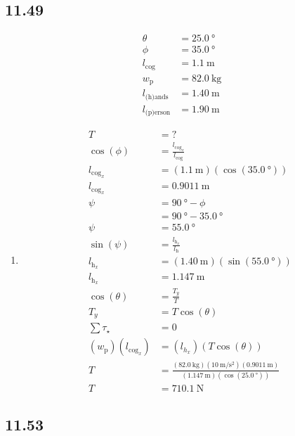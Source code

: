\documentclass{article}
\begin{document}
\subsection{11.49}
\begin{align*}
	\theta & = \SI{25.0}{\degree} \\
	\phi & = \SI{35.0}{\degree} \\
	l_\text{cog} & = \SI{1.1}{\meter} \\
	w_{\text{p}} & = \SI{82.0}{\kilogram} \\
	l_\text{(h)ands} & = \SI{1.40}{\meter} \\
	l_\text{(p)erson} & = \SI{1.90}{\meter}
\end{align*}
\begin{enumerate}[label=\textbf{(\alph*)}]
	\item
		\begin{align*}
			T & = ? \\
			\cos(\phi) & = \frac{l_{\text{cog}_x}}{l_\text{cog}} \\
			l_{\text{cog}_x} & = (\SI{1.1}{\meter})(\cos(\SI{35.0}{\degree})) \\
			l_{\text{cog}_x} & = \SI{0.9011}{\meter} \\
			\psi & = \SI{90}{\degree} - \phi \\
				 & = \SI{90}{\degree} - \SI{35.0}{\degree} \\
			\psi & = \SI{55.0}{\degree} \\
			\sin(\psi) & = \frac{l_{\text{h}_x}}{l_\text{h}} \\
			l_{\text{h}_x} & = (\SI{1.40}{\meter})(\sin(\SI{55.0}{\degree})) \\
			l_{\text{h}_x} & = \SI{1.147}{\meter} \\
			\cos(\theta) & = \frac{T_y}{T} \\
			T_y & = T\cos(\theta) \\
			\sum \tau_\star & = 0 \\
			(w_\text{p})(l_{\text{cog}_x}) & = (l_{h_x})(T\cos(\theta)) \\
			T & = \frac{(\SI{82.0}{\kilogram})(\SI{10}{\meter \per \second \squared})(\SI{0.9011}{\meter})}{(\SI{1.147}{\meter})(\cos(\SI{25.0}{\degree}))} \\
			T & = \SI{710.1}{\newton}
		\end{align*}
\end{enumerate}

\subsection{11.53}
\end{document}
